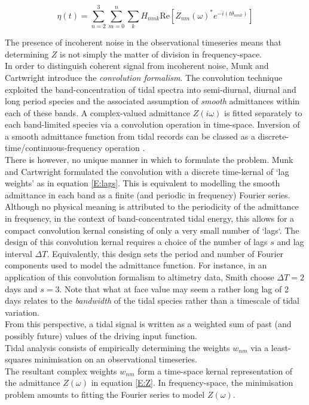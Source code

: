 \begin{equation}
\label{E:Z}
\eta(t) = \sum_{n=2}^{3}\sum_{m=0}^{n}\sum_{k} H_{nmk} \text{Re} \left[ Z_{nm}(\omega)^*e^{-i(t\theta_{nmk})} \right] 
\end{equation}


The presence of incoherent noise in the observational timeseries means that determining $Z$ is not simply the matter of division in frequency-space.\\



In order to distinguish coherent signal from incoherent noise, Munk and Cartwright introduce the \emph{convolution formalism}. The convolution technique exploited the band-concentration of tidal spectra into semi-diurnal, diurnal and long period species and the associated assumption of \emph{smooth} admittances within each of these bands.  A complex-valued admittance $Z(i\omega)$ is fitted separately to each band-limited species via a convolution operation in time-space. 
Inversion of a smooth admittance function from tidal records can be classed as a discrete-time/continuous-frequency operation \citep{Percival:1998tw}.\\

There is however, no unique manner in which to formulate the problem.  Munk and Cartwright formulated the convolution with a discrete time-kernal of `lag weights' as in equation \ref{E:lags}.   This is equivalent to modelling the smooth admittance in each band as a finite (and periodic in frequency) Fourier series.   Although no physical meaning is attributed to the periodicity of the admittance in frequency, in the context of band-concentrated tidal energy, this allows for a compact convolution kernal consisting of only a very small number of `lags`.   The design of this convolution kernal requires a choice of the number of lags $s$ and lag interval $\Delta T$.  Equivalently, this design sets the period and number of Fourier components used to model the admittance function.  For instance, in an application of this convolution formalism to altimetry data, Smith \citep{Smith:1997ut} choose $\Delta T=2$ days and $s=3$.   Note that what at face value may seem a rather long lag of 2 days relates to the \emph{bandwidth} of the tidal species rather than a timescale of tidal variation.\\
From this perspective, a tidal signal is written as a weighted sum of past (and possibly future) values of the driving input function.  \\ 
Tidal analysis consists of empirically determining the weights $w_{nm}$ via a least-squares minimisation on an observational timeseries.\\
The resultant complex weights $w_{nm}$ form a time-space kernal representation of the admittance $Z(\omega)$ in equation \ref{E:Z}.   In frequency-space, the minimisation problem amounts to fitting the Fourier series to model $Z(\omega)$.\\

